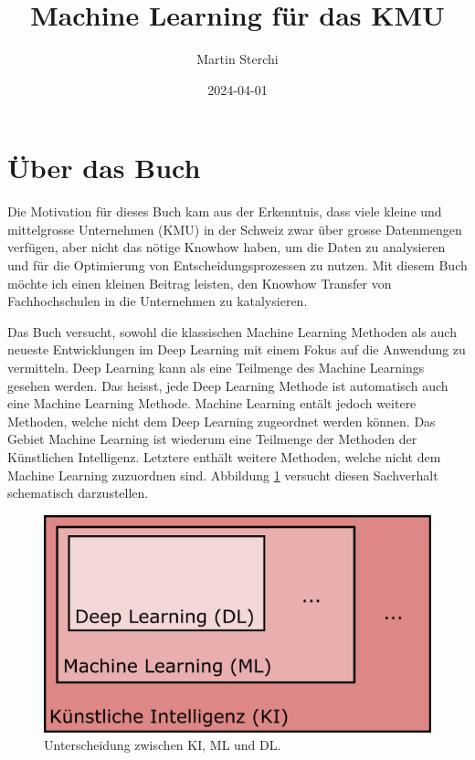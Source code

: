 \documentclass[
]{book}
\title{Machine Learning für das KMU}
\author{Martin Sterchi}
\date{2024-04-01}
\begin{document}
\maketitle

{
\setcounter{tocdepth}{1}
\tableofcontents
}
\hypertarget{uxfcber-das-buch}{%
\chapter*{Über das Buch}\label{uxfcber-das-buch}}

Die Motivation für dieses Buch kam aus der Erkenntnis, dass viele kleine und mittelgrosse Unternehmen (KMU) in der Schweiz zwar über grosse Datenmengen verfügen, aber nicht das nötige Knowhow haben, um die Daten zu analysieren und für die Optimierung von Entscheidungsprozessen zu nutzen. Mit diesem Buch möchte ich einen kleinen Beitrag leisten, den Knowhow Transfer von Fachhochschulen in die Unternehmen zu katalysieren.

Das Buch versucht, sowohl die klassischen Machine Learning Methoden als auch neueste Entwicklungen im Deep Learning mit einem Fokus auf die Anwendung zu vermitteln. Deep Learning kann als eine Teilmenge des Machine Learnings gesehen werden. Das heisst, jede Deep Learning Methode ist automatisch auch eine Machine Learning Methode. Machine Learning entält jedoch weitere Methoden, welche nicht dem Deep Learning zugeordnet werden können. Das Gebiet Machine Learning ist wiederum eine Teilmenge der Methoden der Künstlichen Intelligenz. Letztere enthält weitere Methoden, welche nicht dem Machine Learning zuzuordnen sind. Abbildung \ref{fig:kimldl} versucht diesen Sachverhalt schematisch darzustellen.

\begin{figure}

{\centering \includegraphics[width=0.6\linewidth]{images/KI_ML_DL} 

}

\caption{Unterscheidung zwischen KI, ML und DL. }\label{fig:kimldl}
\end{figure}
\end{document}
